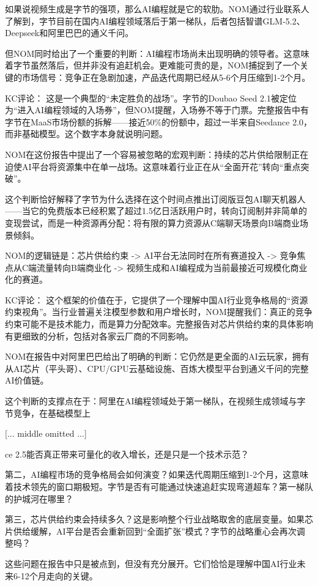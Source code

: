\documentclass[11pt]{ctexart}
\begin{document}
如果说视频生成是字节的强项，那么AI编程就是它的软肋。NOM通过行业联系人了解到，字节目前在国内AI编程领域落后于第一梯队，后者包括智谱GLM-5.2、Deepseek和阿里巴巴的通义千问。

但NOM同时给出了一个重要的判断：AI编程市场尚未出现明确的领导者。这意味着字节虽然落后，但并非没有追赶机会。更难能可贵的是，NOM捕捉到了一个关键的市场信号：竞争正在急剧加速，产品迭代周期已经从5-6个月压缩到1-2个月。

KC评论： 这是一个典型的“未定胜负的战场”。字节的Doubao Seed 2.1被定位为“进入AI编程领域的入场券”，但NOM提醒，入场券不等于门票。完整报告中有字节在MaaS市场份额的拆解——接近50\%的份额中，超过一半来自Seedance 2.0，而非基础模型。这个数字本身就说明问题。

NOM在这份报告中提出了一个容易被忽略的宏观判断：持续的芯片供给限制正在迫使AI平台将资源集中在单一战场。这意味着行业正在从“全面开花”转向“重点突破”。

这个判断恰好解释了字节为什么选择在这个时间点推出订阅版豆包AI聊天机器人——当它的免费版本已经积累了超过1.5亿日活跃用户时，转向订阅制并非简单的变现尝试，而是一种资源再分配：将有限的算力资源从C端聊天场景向B端商业场景倾斜。

NOM的逻辑链是：芯片供给约束 -> AI平台无法同时在所有赛道投入 -> 竞争焦点从C端流量转向B端商业化 -> 视频生成和AI编程成为当前最接近可规模化商业化的赛道。

KC评论： 这个框架的价值在于，它提供了一个理解中国AI行业竞争格局的“资源约束视角”。当行业普遍关注模型参数和用户增长时，NOM提醒我们：真正的竞争约束可能不是技术能力，而是算力分配效率。完整报告对芯片供给约束的具体影响有更细致的分析，包括对各家云厂商的不同影响。

NOM在报告中对阿里巴巴给出了明确的判断：它仍然是更全面的AI云玩家，拥有从AI芯片（平头哥）、CPU/GPU云基础设施、百炼大模型平台到通义千问的完整AI价值链。

这个判断的支撑点在于：阿里在AI编程领域处于第一梯队，在视频生成领域与字节竞争，在基础模型上

[... middle omitted ...]

ce 2.5能否真正带来可量化的收入增长，还是只是一个技术示范？

第二，AI编程市场的竞争格局会如何演变？如果迭代周期压缩到1-2个月，这意味着技术领先的窗口期极短。字节是否有可能通过快速追赶实现弯道超车？第一梯队的护城河在哪里？

第三，芯片供给约束会持续多久？这是影响整个行业战略取舍的底层变量。如果芯片供给缓解，AI平台是否会重新回到“全面扩张”模式？字节的战略重心会再次调整吗？

这些问题在报告中只是被点到，但没有充分展开。它们恰恰是理解中国AI行业未来6-12个月走向的关键。
\end{document}
